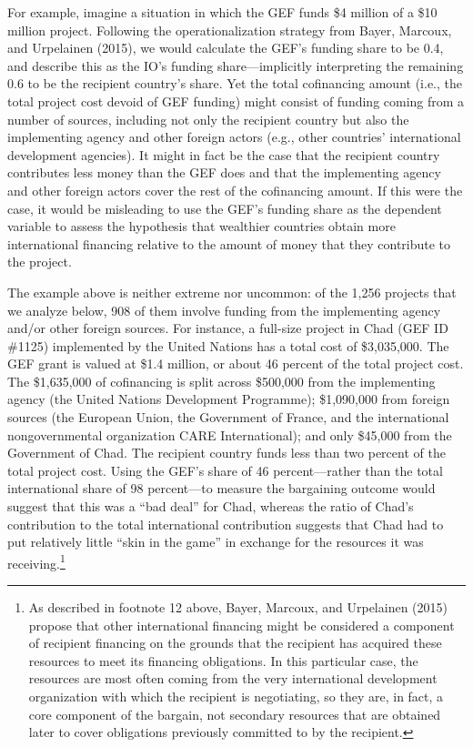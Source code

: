 \documentclass{article}
\begin{document}
For example, imagine a situation in which the GEF funds \$4 million of a \$10 million project.  Following the operationalization strategy from Bayer, Marcoux, and Urpelainen (2015), we would calculate the GEF’s funding share to be 0.4, and describe this as the IO’s funding share---implicitly interpreting the remaining 0.6 to be the recipient country’s share.  Yet the total cofinancing amount (i.e., the total project cost devoid of GEF funding) might consist of funding coming from a number of sources, including not only the recipient country but also the implementing agency and other foreign actors (e.g., other countries’ international development agencies).  It might in fact be the case that the recipient country contributes less money than the GEF does and that the implementing agency and other foreign actors cover the rest of the cofinancing amount.  If this were the case, it would be misleading to use the GEF’s funding share as the dependent variable to assess the hypothesis that wealthier countries obtain more international financing relative to the amount of money that they contribute to the project.

The example above is neither extreme nor uncommon: of the 1,256 projects that we analyze below, 908 of them involve funding from the implementing agency and/or other foreign sources.  For instance, a full-size project in Chad (GEF ID \#1125) implemented by the United Nations has a total cost of \$3,035,000.  The GEF grant is valued at \$1.4 million, or about 46 percent of the total project cost.  The \$1,635,000 of cofinancing is split across \$500,000 from the implementing agency (the United Nations Development Programme); \$1,090,000 from foreign sources (the European Union, the Government of France, and the international nongovernmental organization CARE International); and only \$45,000 from the Government of Chad.  The recipient country funds less than two percent of the total project cost.  Using the GEF’s share of 46 percent---rather than the total international share of 98 percent---to measure the bargaining outcome would suggest that this was a “bad deal” for Chad, whereas the ratio of Chad’s contribution to the total international contribution suggests that Chad had to put relatively little “skin in the game” in exchange for the resources it was receiving.\footnote{As described in footnote 12 above, Bayer, Marcoux, and Urpelainen (2015) propose that other international financing might be considered a component of recipient financing on the grounds that the recipient has acquired these resources to meet its financing obligations.  In this particular case, the resources are most often coming from the very international development organization with which the recipient is negotiating, so they are, in fact, a core component of the bargain, not secondary resources that are obtained later to cover obligations previously committed to by the recipient.}  
\end{document}
